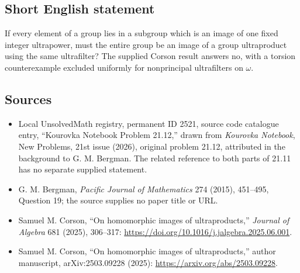 \documentclass[11pt]{article}
\begin{document}
\subsection{Short English statement}
If every element of a group lies in a subgroup which is an image of one fixed integer ultrapower, must the entire group be an image of a group ultraproduct using the same ultrafilter? The supplied Corson result answers no, with a torsion counterexample excluded uniformly for nonprincipal ultrafilters on \(\omega\).
\subsection{Sources}
\begin{itemize}
\item Local UnsolvedMath registry, permanent ID 2521, source code catalogue entry, ``Kourovka Notebook Problem 21.12,'' drawn from \emph{Kourovka Notebook}, New Problems, 21st issue (2026), original problem 21.12, attributed in the background to G. M. Bergman. The related reference to both parts of 21.11 has no separate supplied statement.
\item G. M. Bergman, \emph{Pacific Journal of Mathematics} 274 (2015), 451--495, Question 19; the source supplies no paper title or URL.
\item Samuel M. Corson, ``On homomorphic images of ultraproducts,'' \emph{Journal of Algebra} 681 (2025), 306--317: \url{https://doi.org/10.1016/j.jalgebra.2025.06.001}.
\item Samuel M. Corson, ``On homomorphic images of ultraproducts,'' author manuscript, arXiv:2503.09228 (2025): \url{https://arxiv.org/abs/2503.09228}.
\end{itemize}
\end{document}
